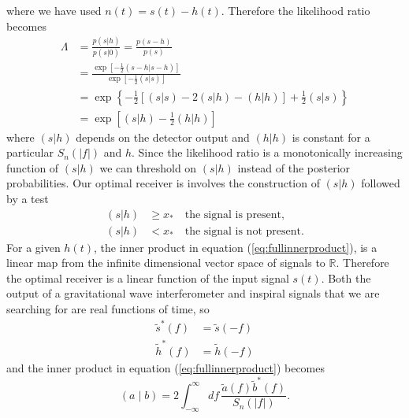 where we have used $n(t) = s(t) - h(t)$. Therefore the likelihood ratio
becomes
\begin{equation}
\begin{split}
\Lambda &= \frac{p(s|h)}{p(s|0)} = \frac{p(s-h)}{p(s)} \\
&= \frac{\exp\left[-\frac{1}{2} (s-h|s-h)\right]}{\exp\left[-\frac{1}{2} (s|s)\right]} \\
&= \exp\left\{-\frac{1}{2}\left[(s|s) - 2(s|h) - (h|h)\right] + \frac{1}{2}(s|s)\right\} \\
&= \exp\left[(s|h) - \frac{1}{2}(h|h)\right]
\label{eq:like1}
\end{split}
\end{equation}
where $(s|h)$ depends on the detector output and $(h|h)$ is constant for a
particular $S_n(|f|)$ and $h$. Since the likelihood ratio is a monotonically
increasing function of $(s|h)$ we can threshold on $(s|h)$ instead of the
posterior probabilities. Our optimal receiver is involves the construction of
$(s|h)$ followed by a test
\begin{equation}
\begin{split}
(s|h) &\ge x_\ast \quad \text{the signal is present}, \\
(s|h) &< x_\ast \quad \text{the signal is not present}.
\end{split}
\end{equation}
For a given $h(t)$, the inner
product in equation (\ref{eq:fullinnerproduct}), is a linear map from the
infinite dimensional vector space of signals to $\mathbb{R}$. Therefore the
optimal receiver is a linear function of the input signal $s(t)$. Both the
output of a gravitational wave interferometer and inspiral signals that we are
searching for are real functions of time, so 
\begin{align}
\tilde{s}^\ast(f) &= \tilde{s}(-f) \\
\tilde{h}^\ast(f) &= \tilde{h}(-f)
\end{align}
and the inner product in equation (\ref{eq:fullinnerproduct}) becomes
\begin{equation}
\left(a\mid b\right) = 2 \int_{-\infty}^{\infty}df\,
\frac{\tilde{a}(f)\tilde{b}^\ast(f)}{S_n\left(\left|f\right|\right)}.
\label{eq:innerproduct}
\end{equation}

